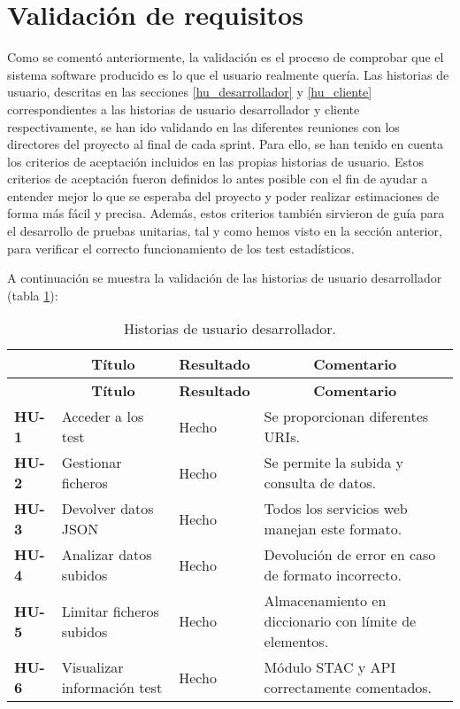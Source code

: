 \section{Validación de requisitos}

Como se comentó anteriormente, la validación es el proceso de comprobar que el sistema software producido es lo que el usuario realmente quería. Las historias de usuario, descritas en las secciones \ref{hu_desarrollador} y \ref{hu_cliente} correspondientes a las historias de usuario desarrollador y cliente respectivamente, se han ido validando en las diferentes reuniones con los directores del proyecto al final de cada sprint. Para ello, se han tenido en cuenta los criterios de aceptación incluidos en las propias historias de usuario. Estos criterios de aceptación fueron definidos lo antes posible con el fin de ayudar a entender mejor lo que se esperaba del proyecto y poder realizar estimaciones de forma más fácil y precisa. Además, estos criterios también sirvieron de guía para el desarrollo de pruebas unitarias, tal y como hemos visto en la sección anterior, para verificar el correcto funcionamiento de los test estadísticos.

A continuación se muestra la validación de las historias de usuario desarrollador (tabla \ref{validacionhud}):

\begin{center}
\setlength{\belowcaptionskip}{0.5cm}
\begin{longtable}[H]{| p{1cm} | p{4.25cm} | p{1cm} | p{5cm} |}
	\hline
	\rowcolor{Gray}
	\multicolumn{1}{|c|}{\textbf{H. Usuario}} & \multicolumn{1}{|c|}{\textbf{Título}} & \multicolumn{1}{|c|}{\textbf{Resultado}} & \multicolumn{1}{|c|}{\textbf{Comentario}} \\ \hline
	\endfirsthead
	\hline
	\rowcolor{Gray}
	\multicolumn{1}{|c|}{\textbf{H. Usuario}} & \multicolumn{1}{|c|}{\textbf{Título}} & \multicolumn{1}{|c|}{\textbf{Resultado}} & \multicolumn{1}{|c|}{\textbf{Comentario}} \\ \hline
	\endhead
	\caption{Historias de usuario desarrollador.}
	\label{validacionhud}
	\endfoot
	\textbf{HU-1} & Acceder a los test & Hecho & Se proporcionan diferentes URIs. \\ \hline
	\textbf{HU-2} & Gestionar ficheros & Hecho & Se permite la subida y consulta de datos. \\ \hline
	\textbf{HU-3} & Devolver datos JSON & Hecho & Todos los servicios web manejan este formato. \\ \hline
	\textbf{HU-4} & Analizar datos subidos & Hecho & Devolución de error en caso de formato incorrecto. \\ \hline
	\textbf{HU-5} & Limitar ficheros subidos & Hecho & Almacenamiento en diccionario con límite de elementos. \\ \hline
	\textbf{HU-6} & Visualizar información test & Hecho & Módulo STAC y API correctamente comentados.  \\ \hline
\end{longtable}
\end{center}

